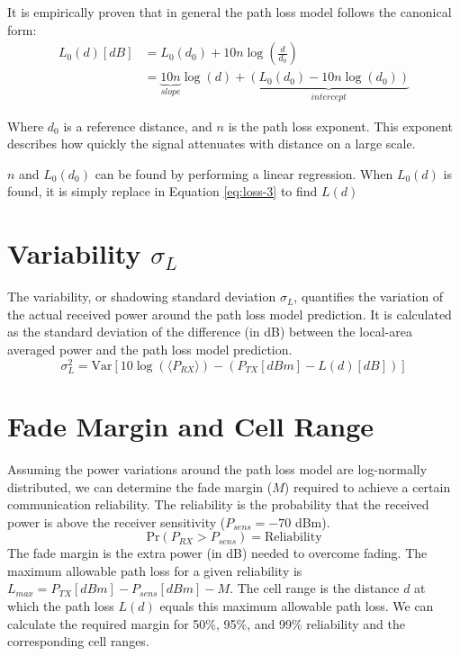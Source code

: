 It is empirically proven that in general the path loss model follows the canonical form:
\begin{align}
	L_{0}(d) [dB] &= L_0(d_0) + 10n \log\left(\frac{d}{d_0}\right)\\
				&= \underbrace{10n}_{slope} \log(d) + \underbrace{(L_0(d_0) - 10n \log(d_0))}_{intercept} \label{eq:lin-reg}
\end{align}


Where $d_0$ is a reference distance, and $n$ is the path loss exponent. This exponent describes how quickly the signal attenuates with distance on a large scale.

$n$ and $L_0(d_0)$ can be found by performing a linear regression. When $L_0(d)$ is found, it is simply replace in Equation \ref{eq:loss-3} to find $L(d)$












\section{Variability $\sigma_L$}
The variability, or shadowing standard deviation $\sigma_L$, quantifies the variation of the actual received power around the path loss model prediction. It is calculated as the standard deviation of the difference (in dB) between the local-area averaged power and the path loss model prediction.
\begin{equation}
	\sigma_L^2 = \text{Var} \left[ 10\log(\langle P_{RX} \rangle) - (P_{TX}[dBm] - L(d)[dB]) \right]
\end{equation}

\section{Fade Margin and Cell Range}
Assuming the power variations around the path loss model are log-normally distributed, we can determine the fade margin ($M$) required to achieve a certain communication reliability. The reliability is the probability that the received power is above the receiver sensitivity ($P_{sens} = -70$ dBm).
\begin{equation}
	\text{Pr}(P_{RX} > P_{sens}) = \text{Reliability}
\end{equation}
The fade margin is the extra power (in dB) needed to overcome fading. The maximum allowable path loss for a given reliability is $L_{max} = P_{TX}[dBm] - P_{sens}[dBm] - M$. The cell range is the distance $d$ at which the path loss $L(d)$ equals this maximum allowable path loss. We can calculate the required margin for 50\%, 95\%, and 99\% reliability and the corresponding cell ranges.

